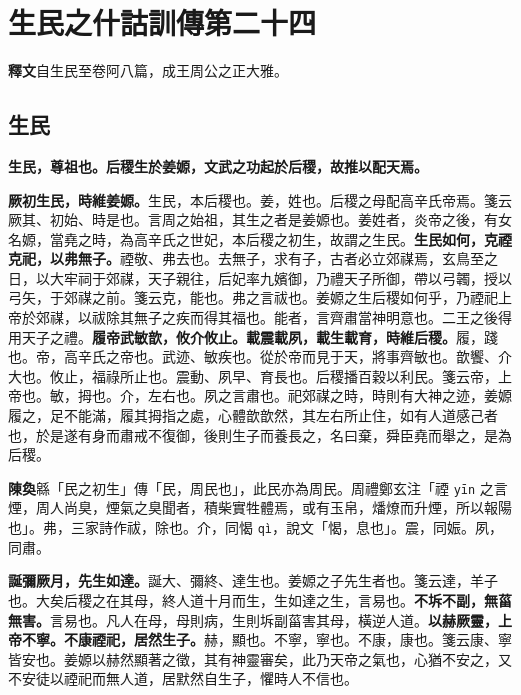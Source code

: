 \chapter{生民之什詁訓傳第二十四}

\begin{quoting}\textbf{釋文}自生民至卷阿八篇，成王周公之正大雅。\end{quoting}

\section{生民}


\textbf{生民，尊祖也。后稷生於姜嫄，文武之功起於后稷，故推以配天焉。}

\textbf{厥初生民，時維姜嫄。}{\footnotesize 生民，本后稷也。姜，姓也。后稷之母配高辛氏帝焉。箋云厥其、初始、時是也。言周之始祖，其生之者是姜嫄也。姜姓者，炎帝之後，有女名嫄，當堯之時，為高辛氏之世妃，本后稷之初生，故謂之生民。}\textbf{生民如何，克禋克祀，以弗無子。}{\footnotesize 禋敬、弗去也。去無子，求有子，古者必立郊禖焉，玄鳥至之日，以大牢祠于郊禖，天子親往，后妃率九嬪御，乃禮天子所御，帶以弓韣，授以弓矢，于郊禖之前。箋云克，能也。弗之言祓也。姜嫄之生后稷如何乎，乃禋祀上帝於郊禖，以祓除其無子之疾而得其福也。能者，言齊肅當神明意也。二王之後得用天子之禮。}\textbf{履帝武敏歆，攸介攸止。載震載夙，載生載育，時維后稷。}{\footnotesize 履，踐也。帝，高辛氏之帝也。武迹、敏疾也。從於帝而見于天，將事齊敏也。歆饗、介大也。攸止，福祿所止也。震動、夙早、育長也。后稷播百穀以利民。箋云帝，上帝也。敏，拇也。介，左右也。夙之言肅也。祀郊禖之時，時則有大神之迹，姜嫄履之，足不能滿，履其拇指之處，心體歆歆然，其左右所止住，如有人道感己者也，於是遂有身而肅戒不復御，後則生子而養長之，名曰棄，舜臣堯而舉之，是為后稷。}

\begin{quoting}\textbf{陳奐}緜「民之初生」傳「民，周民也」，此民亦為周民。周禮鄭玄注「禋 \texttt{yīn} 之言煙，周人尚臭，煙氣之臭聞者，積柴實牲體焉，或有玉帛，燔燎而升煙，所以報陽也」。弗，三家詩作祓，除也。介，同愒 \texttt{qì}，說文「愒，息也」。震，同娠。夙，同肅。\end{quoting}

\textbf{誕彌厥月，先生如達。}{\footnotesize 誕大、彌終、達生也。姜嫄之子先生者也。箋云達，羊子也。大矣后稷之在其母，終人道十月而生，生如達之生，言易也。}\textbf{不坼不副，無菑無害。}{\footnotesize 言易也。凡人在母，母則病，生則坼副菑害其母，橫逆人道。}\textbf{以赫厥靈，上帝不寧。不康禋祀，居然生子。}{\footnotesize 赫，顯也。不寧，寧也。不康，康也。箋云康、寧皆安也。姜嫄以赫然顯著之徵，其有神靈審矣，此乃天帝之氣也，心猶不安之，又不安徒以禋祀而無人道，居默然自生子，懼時人不信也。}

